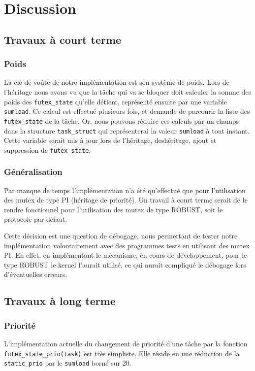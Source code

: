 \section{Discussion}

\subsection{Travaux à court terme}

\subsubsection{Poids}
La clé de voûte de notre implémentation est son système de poids.
Lors de l'héritage nous avons vu que la tâche qui va se bloquer doit calculer la somme
des poids des \verb|futex_state| qu'elle détient, représenté ensuite par une variable \verb|sumload|.
Ce calcul est effectué plusieurs fois, et demande de parcourir la liste des \verb|futex_state| de la tâche.
Or, nous pouvons réduire ces calculs par un champs dans la structure \verb|task_struct| qui représenterai
la valeur \verb|sumload| à tout instant. Cette variable serait mis à jour lors de l'héritage, deshéritage,
ajout et suppression de \verb|futex_state|.

\subsubsection{Généralisation}
Par manque de temps l'implémentation n'a été qu'effectué que pour l'utilisation des mutex de type PI 
(héritage de priorité). Un travail à court terme serait de le rendre
fonctionnel pour l'utilisation des mutex de type ROBUST, soit le protocole par défaut.

Cette décision est une question de débogage, nous permettant 
de tester notre implémentation volontairement avec des programmes tests en utilisant
des mutex PI. En effet, en implémentant le mécanisme, en cours de développement,
 pour le type ROBUST le kernel l'aurait utilisé, ce qui aurait compliqué le débogage lors d'éventuelles erreurs.

\subsection{Travaux à long terme}

\subsubsection{Priorité}
L'implémentation actuelle du changement de priorité d'une tâche par la fonction \verb|futex_state_prio(task)| 
est très simpliste. Elle réside en une réduction de la \verb|static_prio| par le \verb|sumload| 
borné sur 20.

